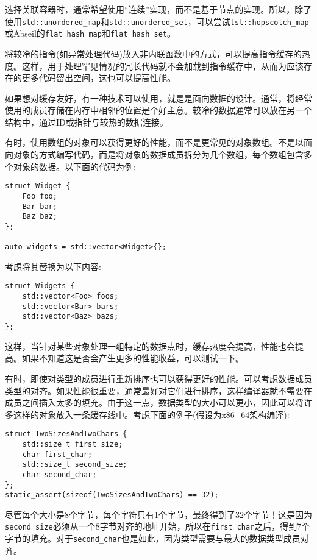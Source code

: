 选择关联容器时，通常希望使用“连续”实现，而不是基于节点的实现。所以，除了使用\texttt{std::unordered\_map}和\texttt{std::unordered\_set}，可以尝试\texttt{tsl::hopscotch\_map}或Abseil的\texttt{flat\_hash\_map}和\texttt{flat\_hash\_set}。

将较冷的指令(如异常处理代码)放入非内联函数中的方式，可以提高指令缓存的热度。这样，用于处理罕见情况的冗长代码就不会加载到指令缓存中，从而为应该存在的更多代码留出空间，这也可以提高性能。


如果想对缓存友好，有一种技术可以使用，就是是面向数据的设计。通常，将经常使用的成员存储在内存中相邻的位置是个好主意。较冷的数据通常可以放在另一个结构中，通过ID或指针与较热的数据连接。

有时，使用数组的对象可以获得更好的性能，而不是更常见的对象数组。不是以面向对象的方式编写代码，而是将对象的数据成员拆分为几个数组，每个数组包含多个对象的数据。以下面的代码为例:

\begin{lstlisting}[style=styleCXX]
struct Widget {
	Foo foo;
	Bar bar;
	Baz baz;
};

auto widgets = std::vector<Widget>{};
\end{lstlisting}

考虑将其替换为以下内容:

\begin{lstlisting}[style=styleCXX]
struct Widgets {
	std::vector<Foo> foos;
	std::vector<Bar> bars;
	std::vector<Baz> bazs;
};
\end{lstlisting}

这样，当针对某些对象处理一组特定的数据点时，缓存热度会提高，性能也会提高。如果不知道这是否会产生更多的性能收益，可以测试一下。

有时，即使对类型的成员进行重新排序也可以获得更好的性能。可以考虑数据成员类型的对齐。如果性能很重要，通常最好对它们进行排序，这样编译器就不需要在成员之间插入太多的填充。由于这一点，数据类型的大小可以更小，因此可以将许多这样的对象放入一条缓存线中。考虑下面的例子(假设为x86\_64架构编译):

\begin{lstlisting}[style=styleCXX]
struct TwoSizesAndTwoChars {
	std::size_t first_size;
	char first_char;
	std::size_t second_size;
	char second_char;
};
static_assert(sizeof(TwoSizesAndTwoChars) == 32);
\end{lstlisting}

尽管每个大小是8个字节，每个字符只有1个字节，最终得到了32个字节！这是因为\texttt{second\_size}必须从一个8字节对齐的地址开始，所以在\texttt{first\_char}之后，得到7个字节的填充。对于\texttt{second\_char}也是如此，因为类型需要与最大的数据类型成员对齐。


